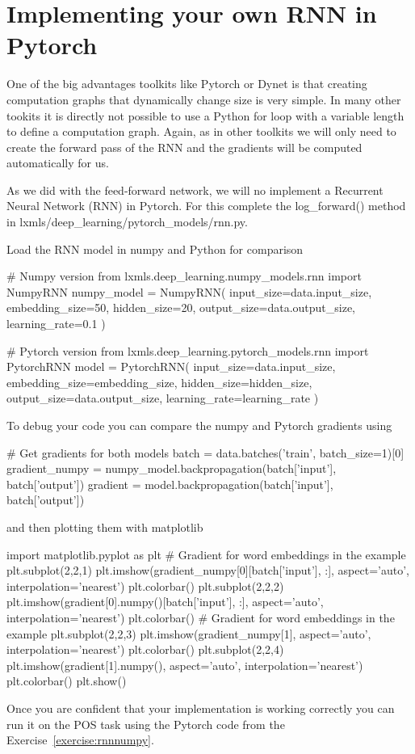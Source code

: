 \clearpage
\section{Implementing your own RNN in Pytorch}

One of the big advantages toolkits like Pytorch or Dynet is that creating computation graphs that dynamically change size is very simple. In many other tookits it is directly not possible to use a Python for loop with a variable length to define a computation graph. Again, as in other toolkits we will only need to create the forward pass of the RNN and the gradients will be computed automatically for us.

\begin{exercise}
As we did with the feed-forward network, we will no implement a
Recurrent Neural Network (RNN) in Pytorch. For this complete the
log\_forward() method in lxmls/deep\_learning/pytorch\_models/rnn.py.

\noindent Load the RNN model in numpy and Python for comparison
\begin{python}
# Numpy version
from lxmls.deep_learning.numpy_models.rnn import NumpyRNN
numpy_model = NumpyRNN(
    input_size=data.input_size,
    embedding_size=50,
    hidden_size=20,
    output_size=data.output_size,
    learning_rate=0.1
)

# Pytorch version
from lxmls.deep_learning.pytorch_models.rnn import PytorchRNN
model = PytorchRNN(
    input_size=data.input_size,
    embedding_size=embedding_size,
    hidden_size=hidden_size,
    output_size=data.output_size,
    learning_rate=learning_rate
)
\end{python}
\noindent To debug your code you can compare the numpy and Pytorch gradients using
\begin{python}
# Get gradients for both models
batch = data.batches('train', batch_size=1)[0]
gradient_numpy = numpy_model.backpropagation(batch['input'], batch['output'])
gradient = model.backpropagation(batch['input'], batch['output'])
\end{python}
\noindent and then plotting them with matplotlib
\begin{python}
import matplotlib.pyplot as plt
# Gradient for  word embeddings in the example
plt.subplot(2,2,1)
plt.imshow(gradient_numpy[0][batch['input'], :], aspect='auto', interpolation='nearest')
plt.colorbar()
plt.subplot(2,2,2)
plt.imshow(gradient[0].numpy()[batch['input'], :], aspect='auto', interpolation='nearest')
plt.colorbar()
# Gradient for  word embeddings in the example
plt.subplot(2,2,3)
plt.imshow(gradient_numpy[1], aspect='auto', interpolation='nearest')
plt.colorbar()
plt.subplot(2,2,4)
plt.imshow(gradient[1].numpy(), aspect='auto', interpolation='nearest')
plt.colorbar()
plt.show()
\end{python}
Once you are confident that your implementation is working correctly you can run it on the POS task using the Pytorch code from the Exercise~\ref{exercise:rnnnumpy}. 
\end{exercise}

